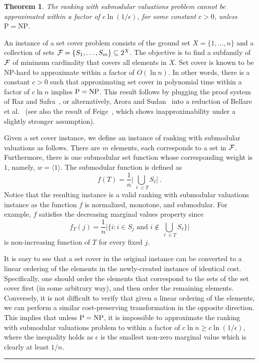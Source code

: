 \documentclass[11pt]{article}
\theoremstyle{plain}
\newtheorem{theorem}{Theorem}[section]
\theoremstyle{definition}
\newcommand{\qedsymb}{\hfill{\rule{2mm}{2mm}}}
\renewenvironment{proof}{\begin{trivlist} \item[\hspace{\labelsep}{\bf \noindent Proof.\/}] }{\qedsymb\end{trivlist}}\newenvironment{proofof}[1]{\begin{trivlist} \item[\hspace{\labelsep}{\bf \noindent Proof of #1.\/}] }{\qedsymb\end{trivlist}}\newenvironment{MyEqn}[1]{\setlength\arraycolsep{2pt}\begin{eqnarray*} #1}{\end{eqnarray*}}
\begin{document}
\begin{theorem} \label{thm:Inapprox}
The ranking with submodular valuations problem cannot be
approximated within a factor of $c \ln(1 / \epsilon)$, for some
constant $c > 0$, unless $\mathrm{P} = \mathrm{NP}$.
\end{theorem}
\begin{proof}
An instance of a set cover problem consists of the ground set $X =
\{1,\ldots,n\}$ and a collection of sets ${\cal F} = \{ S_1,
\ldots, S_m \} \subseteq 2^X$. The objective is to find a
subfamily of ${\cal F}$ of minimum cardinality that covers all
elements in $X$. Set cover is known to be NP-hard to approximate
within a factor of $O(\ln n)$. In other words, there is a constant
$c > 0$ such that approximating set cover in polynomial time
within a factor of $c \ln n$ implies ${\rm P} = {\rm NP}$. This
result follows by plugging the proof system of Raz and
Safra~\cite{RazS97}, or alternatively, Arora and
Sudan~\cite{AroraS03} into a reduction of Bellare et
al.~\cite{BellareGLR93} (see also the result of
Feige~\cite{Feige98}, which shows inapproximability under a
slightly stronger assumption).

Given a set cover instance, we define an instance of ranking with
submodular valuations as follows. There are $m$ elements, each
corresponds to a set in ${\cal F}$. Furthermore, there is one
submodular set function whose corresponding weight is $1$, namely,
$w = \langle 1 \rangle$. The submodular function is defined as
$$
f(T) = \frac{1}{n} \Big|\bigcup_{\ell \in T} S_\ell\Big| \ .
$$
Notice that the resulting instance is a valid ranking with
submodular valuations instance as the function $f$ is normalized,
monotone, and submodular. For example, $f$ satisfies the
decreasing marginal values property since
$$
f_T(j) = \frac{1}{n} \Big|\Big\{ i : i \in S_j \text{ and } i
\notin \bigcup_{\ell \in T} S_\ell\Big\}\Big|
$$
is non-increasing function of $T$ for every fixed $j$.

It is easy to see that a set cover in the original instance can be
converted to a linear ordering of the elements in the
newly-created instance of identical cost. Specifically, one should
order the elements that correspond to the sets of the set cover
first (in some arbitrary way), and then order the remaining
elements. Conversely, it is not difficult to verify that given a
linear ordering of the elements, we can perform a similar
cost-preserving transformation in the opposite direction. This
implies that unless ${\rm P} = {\rm NP}$, it is impossible to
approximate the ranking with submodular valuations problem to
within a factor of $c \ln n \geq c \ln (1/\epsilon)$, where the
inequality holds as $\epsilon$ is the smallest non-zero marginal
value which is clearly at least $1 / n$.~
\end{proof}
\end{document}
